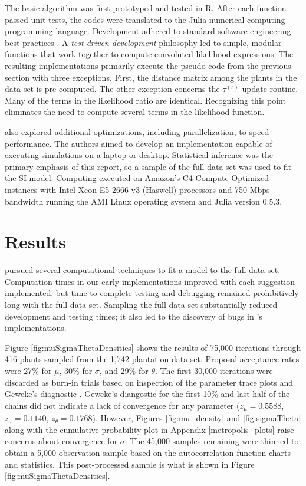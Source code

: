 \documentclass{uwstat572}
\begin{document}
The basic algorithm was first prototyped and tested in R. 
After each function passed unit tests, the codes were translated to the Julia numerical computing programming language. 
Development adhered to standard software engineering best practices \citep{Martin}.
A \textit{test driven development} philosophy led to simple, modular functions that work together to compute convoluted likelihood expressions. 
The resulting implementations primarily execute the pseudo-code from the previous section with three exceptions.
First, the distance matrix among the plants in the data set is pre-computed. 
The other exception concerns the $\tau^{(r)}$ update routine. 
Many of the terms in the likelihood ratio are identical. 
Recognizing this point eliminates the need to compute several terms in the likelihood function. 

\citet{Brown} also explored additional optimizations, including parallelization, to speed performance. 
The authors aimed to develop an implementation capable of executing simulations on a laptop or desktop. 
Statistical inference was the primary emphasis of this report, so a sample of the full data set was used to fit the SI model. 
Computing executed on Amazon's C4 Compute Optimized instances with Intel Xeon E5-2666 v3 (Haswell) processors and 750 Mbps bandwidth running the AMI Linux operating system and Julia version 0.5.3.

\section{Results}
\citet{Brown} pursued several computational techniques to fit a model to the full data set. 
Computation times in our early implementations improved with each suggestion implemented, but time to complete testing and debugging remained prohibitively long with the full data set. 
Sampling the full data set substantially reduced development and testing times; it also led to the discovery of bugs in \citep{Brown}'s implementations.

Figure \ref{fig:muSigmaThetaDensities} shows the results of 75,000 iterations through 416-plants sampled from the 1,742 plantation data set. 
Proposal acceptance rates were 27\% for $\mu$, 30\% for $\sigma$, and 29\% for $\theta$. 
The first 30,000 iterations were discarded as burn-in trials based on inspection of the parameter trace plots and Geweke's diagnostic \citep{Geweke}. 
Geweke's diangostic for the first 10\% and last half of the chains did not indicate a lack of convergence for any parameter ($z_{\mu} = 0.5588$, $z_{\sigma} = 0.1140$,  $z_{\theta} = 0.1768$). 
However, Figures \ref{fig:mu_density} and \ref{fig:sigmaTheta} along with the cumulative probability plot in Appendix \ref{metropolis_plots} raise concerns about convergence for $\sigma$.
The 45,000 samples remaining were thinned to obtain a 5,000-observation sample based on the autocorrelation function charts and statistics. 
This post-processed sample is what is shown in Figure \ref{fig:muSigmaThetaDensities}. 
\end{document}
